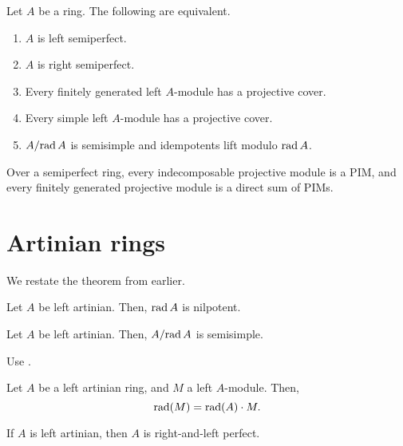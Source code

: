 \documentclass[12pt]{article}
\begin{document}
\begin{thm}
	Let $A$ be a ring. The following are equivalent.
	\begin{enumerate}[label=(\alph*)]
		\item $A$ is left semiperfect.
		\item $A$ is right semiperfect.
		\item Every finitely generated left $A$-module has a projective cover. 
		\item Every simple left $A$-module has a projective cover. 
		\item $A/{\operatorname{rad} A}$ is semisimple and idempotents lift modulo $\operatorname{rad} A$.
	\end{enumerate}
\end{thm}

\begin{thm}
	Over a semiperfect ring, every indecomposable projective module is a PIM, 
	and every finitely generated projective module is a direct sum of PIMs.
\end{thm}

\section{Artinian rings}

We restate the theorem from earlier.

\begin{thm}
	\artinianringimplications
\end{thm}

\begin{thm}
	Let $A$ be left artinian. Then, $\operatorname{rad} A$ is nilpotent.
\end{thm}

\begin{thm}
	Let $A$ be left artinian. Then, $A/{\operatorname{rad} A}$ is semisimple.
\end{thm}
\begin{sketch}
Use .
\end{sketch}

\begin{thm} \label{thm:radical-module-over-artinian}
	Let $A$ be a left artinian ring, and $M$ a left $A$-module. 
	Then,
	\begin{equation*} 
		\operatorname{rad}(M) = \operatorname{rad}(A) \cdot M.
	\end{equation*}
\end{thm}

\begin{thm}
	If $A$ is left artinian, then $A$ is right-and-left perfect.
\end{thm}
\end{document}
